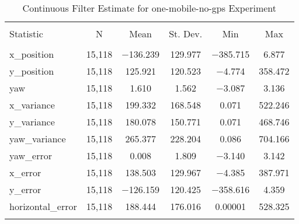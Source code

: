 
\begin{table}[h] \centering 
  \caption{Continuous Filter Estimate for one-mobile-no-gps Experiment} 
  \label{tab:one_mobile_no_gps_continuous_summary} 
\begin{tabular}{@{\extracolsep{5pt}}lccccc} 
\\[-1.8ex]\hline 
\hline \\[-1.8ex] 
Statistic & \multicolumn{1}{c}{N} & \multicolumn{1}{c}{Mean} & \multicolumn{1}{c}{St. Dev.} & \multicolumn{1}{c}{Min} & \multicolumn{1}{c}{Max} \\ 
\hline \\[-1.8ex] 
x\_position & 15,118 & $-$136.239 & 129.977 & $-$385.715 & 6.877 \\ 
y\_position & 15,118 & 125.921 & 120.523 & $-$4.774 & 358.472 \\ 
yaw & 15,118 & 1.610 & 1.562 & $-$3.087 & 3.136 \\ 
x\_variance & 15,118 & 199.332 & 168.548 & 0.071 & 522.246 \\ 
y\_variance & 15,118 & 180.078 & 150.771 & 0.071 & 468.746 \\ 
yaw\_variance & 15,118 & 265.377 & 228.204 & 0.086 & 704.166 \\ 
yaw\_error & 15,118 & 0.008 & 1.809 & $-$3.140 & 3.142 \\ 
x\_error & 15,118 & 138.503 & 129.967 & $-$4.385 & 387.971 \\ 
y\_error & 15,118 & $-$126.159 & 120.425 & $-$358.616 & 4.359 \\ 
horizontal\_error & 15,118 & 188.444 & 176.016 & 0.00001 & 528.325 \\ 
\hline \\[-1.8ex] 
\end{tabular} 
\end{table} 
